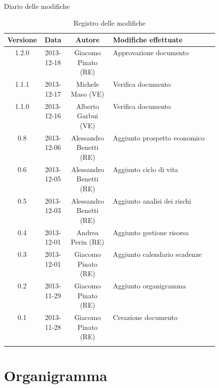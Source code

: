
\newpage
Diario delle modifiche
\begin{center}
\begin{longtable}{|c|c|c|p{0.5\linewidth}|}
\toprule
\textbf{Versione} & \textbf{Data} & \textbf{Autore} & \textbf{Modifiche effettuate}\\


\midrule
1.2.0 & 2013-12-18 & Giacomo Pinato (RE) & Approvazione documento\\
\midrule
1.1.1 & 2013-12-17 & Michele Maso (VE) & Verifica documento\\
\midrule
1.1.0 & 2013-12-16 & Alberto Garbui (VE) & Verifica documento\\


\midrule
0.8 & 2013-12-06 & Alessandro Benetti (RE) & Aggiunto prospetto economico\\
\midrule
0.6 & 2013-12-05 & Alessandro Benetti (RE) & Aggiunto ciclo di vita\\
\midrule
0.5 & 2013-12-03 & Alessandro Benetti (RE) & Aggiunto analisi dei rischi\\
\midrule
0.4 & 2013-12-01 & Andrea Perin (RE) & Aggiunto gestione risorsa\\
\midrule
0.3 & 2013-12-01 & Giacomo Pinato (RE) & Aggiunto calendario scadenze\\
\midrule
0.2 & 2013-11-29 & Giacomo Pinato (RE) & Aggiunto organigramma\\
\midrule
0.1 & 2013-11-28 & Giacomo Pinato (RE) & Creazione documento\\

\bottomrule
\caption{Registro delle modifiche}
\label{tab:changelog}
\end{longtable}
\end{center}

\newpage
\tableofcontents

\newpage
\listoftables
\listoffigures

\newpage
\section{Organigramma}%
\label{1.0}
